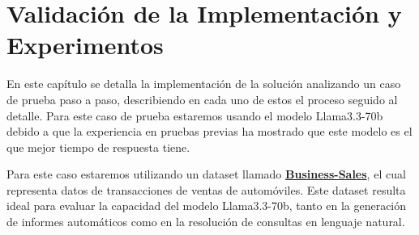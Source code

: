 \chapter{Validación de la Implementación y Experimentos}\label{chapter:implementation}

En este capítulo se detalla la implementación de la solución analizando un caso de prueba paso a paso, describiendo en cada uno de estos el proceso seguido al detalle. Para este caso de prueba estaremos usando el modelo Llama3.3-70b debido a que la experiencia en pruebas previas ha mostrado que este modelo es el que mejor tiempo de respuesta tiene.

Para este caso estaremos utilizando un dataset llamado \href{https://huggingface.co/datasets/sayanroy058/Business-Sales/viewer}{\textbf{Business-Sales}}, el cual representa datos de transacciones de ventas de automóviles. Este dataset resulta ideal para evaluar la capacidad del modelo Llama3.3-70b, tanto en la generación de informes automáticos como en la resolución de consultas en lenguaje natural.

